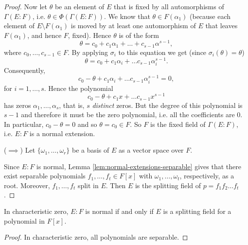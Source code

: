 \begin{theorem}
\begin{proof}
		Now let $\theta$ be an element of $E$ that is fixed by all automorphisms of $\Gamma(E : F)$, i.e. $\theta \in \Phi(\Gamma(E : F))$. We know that $\theta \in F(\alpha_1)$ (because each element of $E \setminus F(\alpha_1)$ is moved by at least one automorphism of $E$ that leaves $F(\alpha_1)$, and hence $F$, fixed). Hence $\theta$ is of the form
		\[
			\theta = c_0 + c_1 \alpha_1 + \dots + c_{s - 1} \alpha^{s - 1},
		\]
		where $c_0, \dots, c_{s - 1} \in F$. By applying $\sigma_i$ to this equation we get (since $\sigma_i(\theta) = \theta$)
		\[
			\theta = c_0 + c_1 \alpha_i + \dots c_{s - 1} \alpha_i^{s - 1}.
		\]
		Consequently,
		\[
			c_0 - \theta + c_1 \alpha_i + \dots c_{s - 1} \alpha_i^{s - 1} = 0,
		\]
		for $i = 1, \dots, s$. Hence the polynomial
		\[
			c_0 - \theta + c_1 x + \dots c_{s - 1} x^{s - 1}
		\]
		has zeros $\alpha_1, \dots, \alpha_s$, that is, $s$ \emph{distinct} zeros. But the degree of this polynomial is $s - 1$ and therefore it must be the zero polynomial, i.e. all the coefficients are 0. In particular, $c_0 - \theta = 0$ and so $\theta = c_0 \in F$. So $F$ is the fixed field of $\Gamma(E : F)$, i.e. $E : F$ is a normal extension.
		\vspace{2ex}
		
		\noindent ($\implies$) Let $\{\omega_1, \dots, \omega_r\}$ be a basis of $E$ as a vector space over $F$.
		
		Since $E : F$ is normal, Lemma \ref{lem:normal-extensions-separable} gives that there exist separable polynomials $f_1, \dots, f_t \in F[x]$ with $\omega_1, \dots, \omega_t$, respectively, as a root. Moreover, $f_1, \dots, f_t$ split in $E$. Then $E$ is the splitting field of $p = f_1 f_2 \dots f_t$.
	\end{proof}
\end{theorem}

\begin{corollary}
	In characteristic zero, $E : F$ is normal if and only if $E$ is a splitting field for a polynomial in $F[x]$.
	\begin{proof}
		In characteristic zero, all polynomials are separable.
	\end{proof}
\end{corollary}

